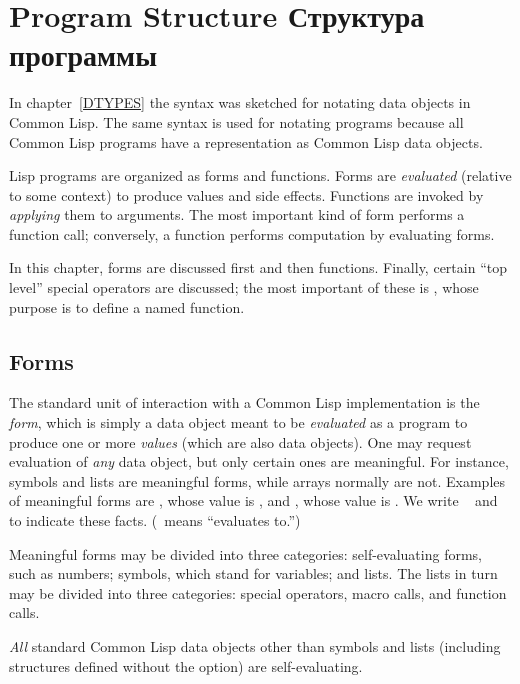 
\clearpage\def\pagestatus{FINAL PROOF}

\ifx \rulang\Undef
\chapter{Program Structure Структура программы}
\label{PROGS}

In chapter~\ref{DTYPES} the syntax was sketched for notating data objects
in Common Lisp.  The same syntax is used for notating programs because all
Common Lisp programs have a representation as Common Lisp data objects.

Lisp programs are organized as forms and functions.  Forms are
\emph{evaluated} (relative to some context) to produce values and side
effects.  Functions are invoked by \emph{applying} them to arguments.
The most important kind of form performs a function call;
conversely, a function performs computation by evaluating forms.

In this chapter, forms are discussed first and then functions.
Finally, certain ``top level'' special operators are discussed; the most
important of these is , whose purpose is to define a
named function.

\section{Forms}

The standard unit of interaction with a Common Lisp implementation is the \emph{form},
which is simply a data object meant to be \emph{evaluated} as a program
to produce one or more \emph{values} (which are also data objects).
One may request evaluation of \emph{any} data object, but only certain ones
are meaningful.  For instance,
symbols and lists are meaningful forms, while arrays
normally are not.  Examples of meaningful forms are ,
whose value is , and , whose value is .
We write  \EV\  and  \EV\ 
to indicate these facts.  (\EV\ means ``evaluates to.'')

Meaningful forms may be divided into three categories:
self-evaluating forms, such as numbers; symbols, which stand
for variables; and lists.  The lists in turn may be divided
into three categories: special operators, macro calls, and function calls.

\emph{All} standard Common Lisp data objects other than symbols
and lists (including  structures defined
without the  option) are self-evaluating.


